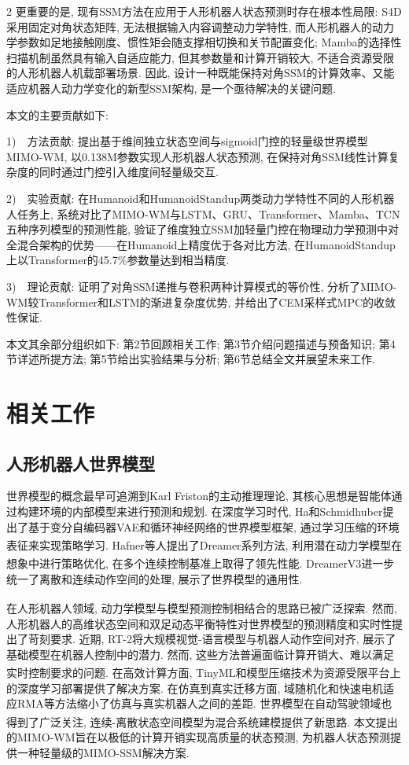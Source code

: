 \begin{multicols}{2}
更重要的是, 现有SSM方法在应用于人形机器人状态预测时存在根本性局限:
S4D采用固定对角状态矩阵, 无法根据输入内容调整动力学特性,
而人形机器人的动力学参数如足地接触刚度、惯性矩会随支撑相切换和关节配置变化;
Mamba的选择性扫描机制虽然具有输入自适应能力, 但其参数量和计算开销较大,
不适合资源受限的人形机器人机载部署场景.
因此, 设计一种既能保持对角SSM的计算效率、又能适应机器人动力学变化的新型SSM架构, 是一个亟待解决的关键问题.

本文的主要贡献如下:

1)~~方法贡献: 提出基于维间独立状态空间与sigmoid门控的轻量级世界模型MIMO-WM, 以0.138M参数实现人形机器人状态预测, 在保持对角SSM线性计算复杂度的同时通过门控引入维度间轻量级交互.

2)~~实验贡献: 在Humanoid和HumanoidStandup两类动力学特性不同的人形机器人任务上, 系统对比了MIMO-WM与LSTM、GRU、Transformer、Mamba、TCN五种序列模型的预测性能, 验证了维度独立SSM加轻量门控在物理动力学预测中对全混合架构的优势——在Humanoid上精度优于各对比方法, 在HumanoidStandup上以Transformer的45.7\%参数量达到相当精度.

3)~~理论贡献: 证明了对角SSM递推与卷积两种计算模式的等价性, 分析了MIMO-WM较Transformer和LSTM的渐进复杂度优势, 并给出了CEM采样式MPC的收敛性保证.

本文其余部分组织如下: 第2节回顾相关工作; 第3节介绍问题描述与预备知识; 第4节详述所提方法; 第5节给出实验结果与分析; 第6节总结全文并展望未来工作.

\section{相关工作}

\subsection{人形机器人世界模型}

世界模型的概念最早可追溯到Karl Friston的主动推理理论,
其核心思想是智能体通过构建环境的内部模型来进行预测和规划.
在深度学习时代, Ha和Schmidhuber提出了基于变分自编码器VAE和循环神经网络的世界模型框架,
通过学习压缩的环境表征来实现策略学习.
Hafner等人\textsuperscript{\cite{13}}提出了Dreamer系列方法, 利用潜在动力学模型在想象中进行策略优化,
在多个连续控制基准上取得了领先性能.
DreamerV3\textsuperscript{\cite{14}}进一步统一了离散和连续动作空间的处理, 展示了世界模型的通用性.

在人形机器人领域, 动力学模型与模型预测控制相结合的思路已被广泛探索\textsuperscript{\cite{15,16,17}}.
然而, 人形机器人的高维状态空间和双足动态平衡特性对世界模型的预测精度和实时性提出了苛刻要求.
近期, RT-2将大规模视觉-语言模型与机器人动作空间对齐,
展示了基础模型在机器人控制中的潜力.
然而, 这些方法普遍面临计算开销大、难以满足实时控制要求的问题.
在高效计算方面, TinyML\textsuperscript{\cite{18}}和模型压缩技术为资源受限平台上的深度学习部署提供了解决方案.
在仿真到真实迁移方面, 域随机化和快速电机适应RMA等方法缩小了仿真与真实机器人之间的差距.
世界模型在自动驾驶领域也得到了广泛关注\textsuperscript{\cite{19}}, 连续-离散状态空间模型为混合系统建模提供了新思路.
本文提出的MIMO-WM旨在以极低的计算开销实现高质量的状态预测,
为机器人状态预测提供一种轻量级的MIMO-SSM解决方案.


\end{multicols}
